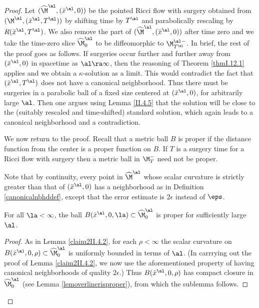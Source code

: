 \begin{proof}
Let $(\widehat\M^\al,(\bar x^\al,0))$ be the pointed Ricci flow
with surgery obtained from $(\M^\al,(\bar x^\al,T^\al))$
by shifting time by $T^\al$ and parabolically rescaling by
$R(\bar x^\al,T^\al)$.
We also remove the part of
$(\widehat\M^\al,(\bar x^\al,0))$ after time zero and
we take the time-zero slice $\widehat\M^\al_0$ to be
diffeomorphic to $\M^{\al -}_{T^\al}$.
In brief, the rest of the proof goes as follows.  If surgeries
occur further and further away from $(\bar x^\al,0)$
in spacetime as $\al\ra\infty$, then the reasoning of Theorem
\ref{thmI.12.1} applies and we obtain a $\kappa$-solution as a limit.
This would contradict the fact that $(\bar x^\al,T^\al)$ does
not have a canonical neighborhood.  Thus there must be
surgeries in a parabolic ball of a fixed size centered
at $(\bar x^\al,0)$, for arbitrarily large $\al$. Then one
argues using
Lemma \ref{II.4.5} that the solution will be close to
the (suitably rescaled and time-shifted) standard solution,
which again leads to a canonical neighborhood and a
contradiction.

We now return to the proof.
Recall that a metric ball $B$ is
proper if the distance function from the center is a proper
function on $B$. If $T$ is a surgery time for a
Ricci flow with surgery then
a metric ball in $\M_T^-$ need not be proper.

Note that by continuity,
every  point in $\widehat\M^\al$ whose scalar
curvature is strictly greater than that of $(\bar x^\al,0)$ has a
neighborhood as in Definition \ref{canonicalnbhddef}, except
that the error estimate
is $2 \epsilon$ instead of $\eps$.

\begin{lemma}
  \label{lem:kl-construction-ricci-flow-surgery-ricci-flow-surgery-lemma}

For all $\la<\infty$,
the ball $B(\bar x^\al,0,\la)\subset\widehat\M^\al_0$
is proper for sufficiently
large $\al$.
\end{lemma}
\begin{proof}
As in Lemma \ref{claim2II.4.2}, for each $\rho < \infty$
the scalar curvature on
$B(\bar x^\al, 0, \rho) \subset \widehat\M^{\al}_0$
is uniformly bounded in terms of $\al$.
(In carrrying out the proof of Lemma \ref{claim2II.4.2},
we now use the aforementioned property of having
canonical neighborhoods of quality $2\epsilon$.)
Thus $B(\bar x^\al, 0, \rho)$ has compact closure in
$\widehat\M^{\al}_0$
(see Lemma \ref{lemoverlinerisproper}), from which the sublemma follows.
\end{proof}


\end{proof}

